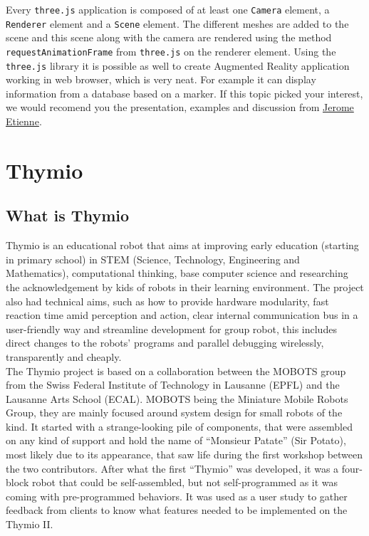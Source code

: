 \documentclass{scrbook}
\begin{document}
Every \texttt{three.js} application is composed of at least one \texttt{Camera} element, a \texttt{Renderer} element and a \texttt{Scene} element. The different meshes are added to the scene and this scene along with the camera are rendered using the method 
\texttt{requestAnimationFrame} from \texttt{three.js} on the renderer element. 
Using the \texttt{three.js} library it is possible as well to create Augmented Reality application working in web browser, which is very neat. For example it can display information from a database based on a marker. If this topic picked your interest, 
we would recomend you the presentation, examples and discussion from \href{http://jeromeetienne.github.io/slides/augmentedrealitywiththreejs/}{Jerome Etienne}.

\chapter{Thymio}
\section{What is Thymio} 

Thymio is an educational robot that aims at improving early education (starting in primary school) in STEM (Science, Technology, Engineering and Mathematics),
computational thinking, base computer science and researching the acknowledgement by kids of robots in their learning environment.
The project also had technical aims, such as how to provide hardware modularity, fast reaction time amid perception and action,
clear internal communication bus in a user-friendly way and streamline development for group robot, this includes direct changes to the robots’ programs and parallel debugging wirelessly, 
transparently and cheaply.\\

The Thymio project is based on a collaboration between the MOBOTS group from the Swiss Federal Institute of Technology in Lausanne (EPFL) and the Lausanne Arts School (ECAL).
MOBOTS being the Miniature Mobile Robots Group, they are mainly focused around system design for small robots of the kind. It started with a strange-looking pile of components, 
that were assembled on any kind of support and hold the name of “Monsieur Patate” (Sir Potato), most likely due to its appearance, 
that saw life during the first workshop between the two contributors. After what the first “Thymio” was developed, 
it was a four-block robot that could be self-assembled, but not self-programmed as it was coming with pre-programmed behaviors. 
It was used as a user study to gather feedback from clients to know what features needed to be implemented on the Thymio II.\\
\end{document}
